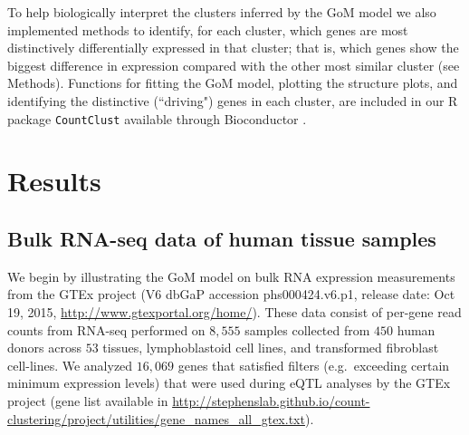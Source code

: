 \documentclass[10pt,letterpaper]{article}
\begin{document}

To help biologically interpret the clusters inferred by the GoM model we also implemented methods to identify, for each cluster, which genes
are most distinctively differentially expressed in that cluster; that is, which genes show the biggest difference in expression compared with the other most similar cluster (see Methods). Functions for fitting the GoM model, plotting the
structure plots, and identifying the distinctive (``driving") genes in each cluster, are included in our R package {\tt CountClust} \cite{Dey2016} available through Bioconductor \cite{Gentleman2003}.


\section*{Results}

\subsection*{Bulk RNA-seq data of human tissue samples}

We begin by illustrating the GoM model on bulk RNA expression measurements from the GTEx project (V6 dbGaP accession phs000424.v6.p1, release date: Oct 19, 2015, \url{http://www.gtexportal.org/home/}). These data consist of per-gene read counts from RNA-seq performed on $8,555$ samples collected from $450$ human donors across $53$ tissues, lymphoblastoid cell lines, and transformed fibroblast cell-lines. We analyzed $16,069$ genes that satisfied filters (e.g.~exceeding certain minimum expression levels) that were used during eQTL analyses by the GTEx project (gene list available in \url{http://stephenslab.github.io/count-clustering/project/utilities/gene_names_all_gtex.txt}).
\end{document}
